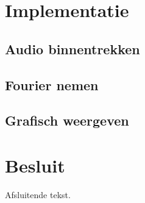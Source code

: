 \documentclass[a4paper,kul]{kulakarticle} %
\begin{document}
\section{Implementatie}

\subsection{Audio binnentrekken}

\subsection{Fourier nemen}

\subsection{Grafisch weergeven}

\section{Besluit}

Afsluitende tekst.
\end{document}
